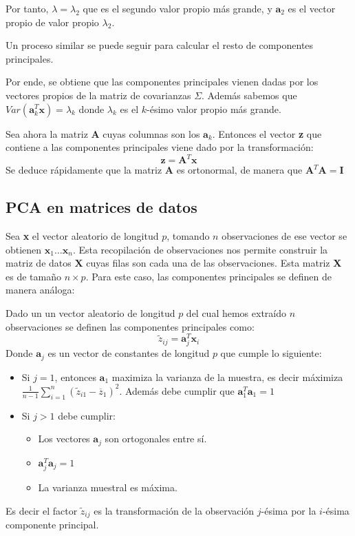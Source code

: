 \noindent Por tanto, $\lambda=\lambda_2$ que es el segundo valor propio más grande, y $\textbf{a}_2$ es el vector propio de valor propio $\lambda_2$.

\noindent Un proceso similar se puede seguir para calcular el resto de componentes principales. 

\noindent Por ende, se obtiene que las componentes principales vienen dadas por los vectores propios de la matriz de covarianzas $\Sigma $. Además sabemos que $Var(\textbf{a}_k^T \textbf{x})=\lambda_k$ donde $\lambda_k$ es el $k$-ésimo valor propio más grande. 

\noindent Sea ahora la matriz $\textbf{A}$ cuyas columnas son los $\textbf{a}_k$. Entonces el vector \textbf{z} que contiene a las componentes principales viene dado por la transformación:
\begin{equation}
\textbf{z}=\textbf{A}^T\textbf{x}
\end{equation}
\noindent Se deduce rápidamente que la matriz $\textbf{A}$ es ortonormal, de manera que $\textbf{A}^T\textbf{A}=\textbf{I}$


\newpage

\subsection{PCA en matrices de datos}

\noindent Sea \textbf{x} el vector aleatorio de longitud $p$, tomando $n$ observaciones de ese vector se obtienen $\textbf{x}_1\ldots \textbf{x}_n$.
Esta recopilación de observaciones nos permite construir la matriz de datos $\textbf{X}$ cuyas filas son cada una de las observaciones. Esta matriz \textbf{X} es de tamaño $n\times p$. 
Para este caso, las componentes principales se definen de manera análoga:
\begin{defi}
Dado un un vector aleatorio de longitud $p$ del cual hemos extraído $n$ observaciones se definen las componentes principales como:
\begin{equation}
\widetilde{z}_{ij}=\textbf{a}^T_j\textbf{x}_i
\end{equation}
Donde $\textbf{a}_j$ es un vector de constantes de longitud $p$ que cumple lo siguiente:
\begin{itemize}
\item Si $j=1$, entonces $\textbf{a}_1$ maximiza la varianza de la muestra, es decir máximiza $\frac{1}{n-1}\sum_{i=1}^{n}(\widetilde{z}_{i1}-\overline{z}_1)^2$. Además debe cumplir que $\textbf{a}_1^T\textbf{a}_1=1$
\item Si $j>1$ debe cumplir:
\begin{itemize}
\item Los vectores $\textbf{a}_j$ son ortogonales entre sí. 
\item $\textbf{a}_j^T \textbf{a}_j=1$
\item La varianza muestral es máxima. 
\end{itemize}
\end{itemize}
Es decir el factor $\widetilde{z}_{ij}$ es la transformación de la observación $j$-ésima por la $i$-ésima componente principal. 
 
\end{defi}

